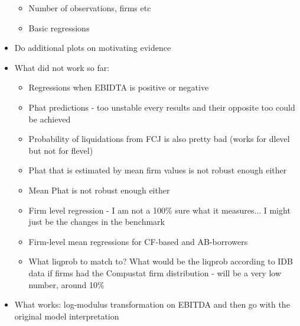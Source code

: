 \documentclass[12pt]{article}
\begin{document}
\begin{itemize}
\begin{itemize}
            \item Number of observations, firms etc \checkmark
            \item Basic regressions \checkmark
        \end{itemize}
    \item Do additional plots on motivating evidence \checkmark
    \item What did not work so far: \checkmark
        \begin{itemize} \setlength\itemsep{0em}
            \item Regressions when EBIDTA is positive or negative
            \item Phat predictions - too unstable every results and their opposite too could be achieved
            \item Probability of liquidations from FCJ is also pretty bad (works for dlevel but not for flevel)
            \item Phat that is estimated by mean firm values is not robust enough either
            \item Mean Phat is not robust enough either
            \item Firm level regression - I am not a 100\% sure what it measures... I might just be the changes in the benchmark
            \item Firm-level mean regressions for CF-based and AB-borrowers
            \item What liqprob to match to? What would be the liqprob according to IDB data if firms had the Compustat firm distribution - will be a very low number, around 10\%
        \end{itemize}
    \item What works: log-modulus transformation on EBITDA and then go with the original model interpretation \checkmark
\end{itemize} \normalsize

\newpage
\end{document}
